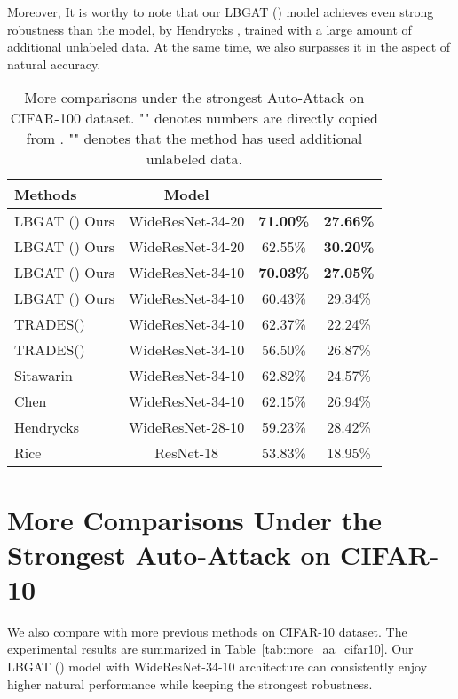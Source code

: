 \documentclass[final]{cvpr}
\begin{document}
Moreover, It is worthy to note that our LBGAT () model achieves even strong robustness than the model, by Hendrycks \etal \cite{hendrycks2019using}, trained with a large amount of additional unlabeled data. At the same time, we also surpasses it in the aspect of natural accuracy.   

\vspace{0.2in}
\begin{table*}[h]
	\large
	\centering
	\caption{More comparisons under the strongest Auto-Attack on CIFAR-100 dataset. "\dag" denotes numbers are directly copied from \cite{croce2020reliable}. "" denotes that the method has used additional unlabeled data.} 
	\vspace{0.1cm}
	\begin{tabular}{l|c|c|c}
		\textbf{Methods} & Model & & \\
		\hline
		\hline
		LBGAT () Ours                 &WideResNet-34-20 &\textbf{71.00\%} &\textbf{27.66\%} \\
		LBGAT () Ours                 &WideResNet-34-20 &62.55\% &\textbf{30.20\%} \\
		LBGAT () Ours                 &WideResNet-34-10 &\textbf{70.03\%} &\textbf{27.05\%} \\
		LBGAT () Ours                 &WideResNet-34-10 &60.43\% &29.34\% \\
		\hline
		\hline
		
		TRADES() \cite{zhang2019theoretically}      &WideResNet-34-10 &62.37\% &22.24\% \\
		TRADES() \cite{zhang2019theoretically}      &WideResNet-34-10 &56.50\% &26.87\% \\
		Sitawarin \etal \cite{sitawarin2020improving} \dag &WideResNet-34-10 &62.82\%    &24.57\% \\
		Chen \etal \cite{chen2020efficient} \dag           &WideResNet-34-10 &62.15\%	&26.94\% \\ 
		Hendrycks \etal \cite{hendrycks2019using} \dag      &WideResNet-28-10 &59.23\%	&28.42\% \\
		Rice \etal \cite{rice2020overfitting} \dag         &ResNet-18        &53.83\%    &18.95\% \\
		\hline
		\hline
	\end{tabular}
	\label{tab:more_aa_cifar100}
\end{table*}

\newpage
\section{More Comparisons Under the Strongest Auto-Attack on CIFAR-10}
We also compare with more previous methods on CIFAR-10 dataset. The experimental results are summarized in Table~\ref{tab:more_aa_cifar10}. Our LBGAT () model with WideResNet-34-10 architecture can consistently enjoy higher natural performance while keeping the strongest robustness. 
\end{document}
